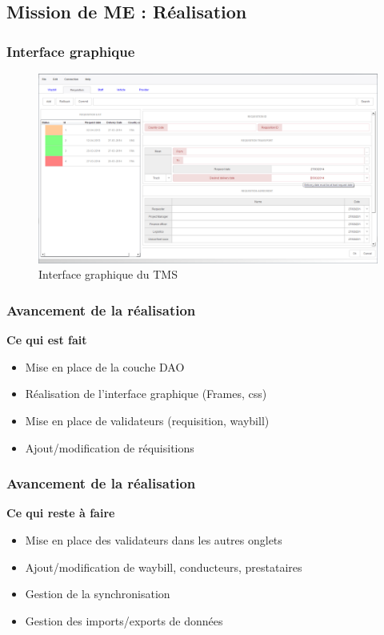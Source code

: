 \subsection{Mission de ME : Réalisation}
	\begin{frame}
		\frametitle{Interface graphique}
		\begin{figure}[htbp]
			\centering
			\includegraphics[scale=0.24]{Images/Interface}
			\caption{Interface graphique du TMS}
		\end{figure}
	\end{frame}
	\begin{frame}		
		\frametitle{Avancement de la réalisation}
		\begin{block}{\textbf{Ce qui est fait}}
			\begin{itemize}
				\item Mise en place de la couche DAO
				\item Réalisation de l'interface graphique (Frames, css)
				\item Mise en place de validateurs (requisition, waybill)
				\item Ajout/modification de réquisitions
			\end{itemize}
		\end{block}
	\end{frame}
	\begin{frame}	
		\frametitle{Avancement de la réalisation}
		\begin{block}{\textbf{Ce qui reste à faire}}
			\begin{itemize}
				\item Mise en place des validateurs dans les autres onglets
				\item Ajout/modification de waybill, conducteurs, prestataires
				\item Gestion de la synchronisation
				\item Gestion des imports/exports de données
			\end{itemize}
		\end{block}
	\end{frame}